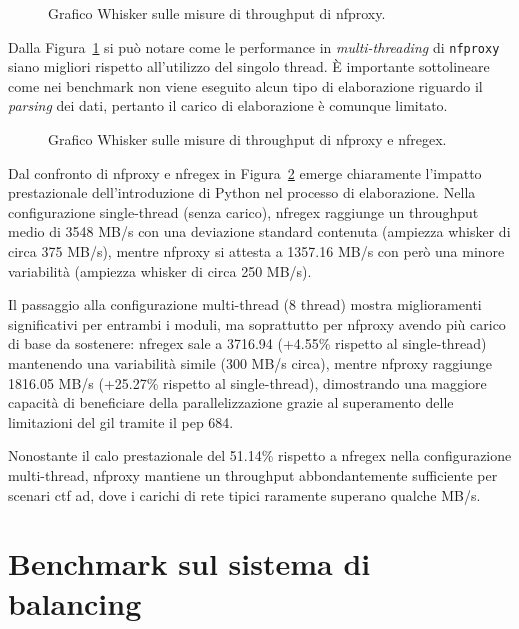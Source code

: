 \begin{figure}[H]
    \centering
    
    \caption{Grafico Whisker sulle misure di throughput di nfproxy.}\label{fig:wisker_nfproxy}
\end{figure}

Dalla Figura~\ref{fig:wisker_nfproxy} si può notare come le performance in \textit{multi-threading} di \texttt{\gls{nfproxy}} siano migliori rispetto all'utilizzo del singolo thread. È importante sottolineare come nei benchmark non viene eseguito alcun tipo di elaborazione riguardo il \textit{parsing} dei dati, pertanto il carico di elaborazione è comunque limitato.

\begin{figure}[H]
    \centering
    
    \caption{Grafico Whisker sulle misure di throughput di nfproxy e nfregex.}\label{fig:wisker_nfproxy_nfregex}
\end{figure}

Dal confronto di \gls{nfproxy} e \gls{nfregex} in Figura~\ref{fig:wisker_nfproxy_nfregex} emerge chiaramente l'impatto prestazionale dell'introduzione di Python nel processo di elaborazione. Nella configurazione single-thread (senza carico), \gls{nfregex} raggiunge un throughput medio di 3548 MB/s con una deviazione standard contenuta (ampiezza whisker di circa 375 MB/s), mentre \gls{nfproxy} si attesta a 1357.16 MB/s con però una minore variabilità (ampiezza whisker di circa 250 MB/s).

Il passaggio alla configurazione multi-thread (8 thread) mostra miglioramenti significativi per entrambi i moduli, ma soprattutto per \gls{nfproxy} avendo più carico di base da sostenere: \gls{nfregex} sale a 3716.94 (+4.55\% rispetto al single-thread) mantenendo una variabilità simile (300 MB/s circa), mentre \gls{nfproxy} raggiunge 1816.05 MB/s (+25.27\% rispetto al single-thread), dimostrando una maggiore capacità di beneficiare della parallelizzazione grazie al superamento delle limitazioni del \gls{gil} tramite il \gls{pep} 684.

Nonostante il calo prestazionale del 51.14\% rispetto a \gls{nfregex} nella configurazione multi-thread, \gls{nfproxy} mantiene un throughput abbondantemente sufficiente per scenari \gls{ctf} \gls{ad}, dove i carichi di rete tipici raramente superano qualche MB/s.

\section{Benchmark sul sistema di balancing}\label{balancing_benchmark}

